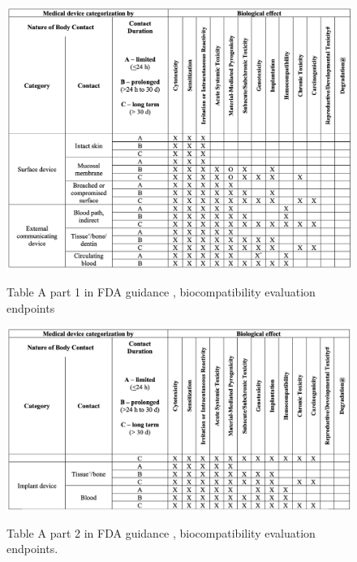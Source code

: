 \documentclass{Configuration_Files/PoliMi3i_thesis}
\begin{document}
\begin{figure}[H]
	\includegraphics[scale=0.3]{tab1_fda.png}
	\centering
    \label{tab_da_1}
    \caption{Table A part 1 in FDA guidance \cite{healthUseInternationalStandard2023}, biocompatibility evaluation endpoints}
\end{figure}

\begin{figure}[H]

	\includegraphics[scale=0.3]{tab2_fda.png}
	\centering
    \label{tab_da_2}
    \caption{Table A part 2 in FDA guidance \cite{healthUseInternationalStandard2023}, biocompatibility evaluation endpoints.}
\end{figure}
\end{document}
